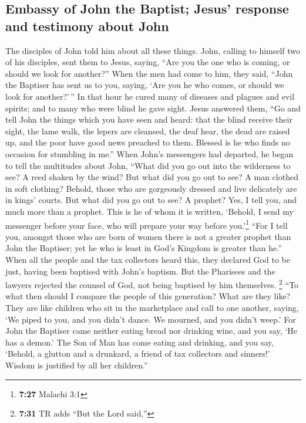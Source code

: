 \hypertarget{embassy-of-john-the-baptist-jesus-response-and-testimony-about-john}{%
\subsection{Embassy of John the Baptist; Jesus' response and testimony
about
John}\label{embassy-of-john-the-baptist-jesus-response-and-testimony-about-john}}

 The disciples of John told him about all these things.
 John, calling to himself two of his disciples, sent them
to Jesus, saying, ``Are you the one who is coming, or should we look for
another?''  When the men had come to him, they said,
``John the Baptiser has sent us to you, saying, `Are you he who comes,
or should we look for another?'\,''  In that hour he
cured many of diseases and plagues and evil spirits; and to many who
were blind he gave sight.  Jesus answered them, ``Go and
tell John the things which you have seen and heard: that the blind
receive their sight, the lame walk, the lepers are cleansed, the deaf
hear, the dead are raised up, and the poor have good news preached to
them.  Blessed is he who finds no occasion for stumbling
in me.''  When John's messengers had departed, he began
to tell the multitudes about John, ``What did you go out into the
wilderness to see? A reed shaken by the wind?  But what
did you go out to see? A man clothed in soft clothing? Behold, those who
are gorgeously dressed and live delicately are in kings' courts.
 But what did you go out to see? A prophet? Yes, I tell
you, and much more than a prophet.  This is he of whom it
is written, `Behold, I send my messenger before your face, who will
prepare your way before you.'\footnote{\textbf{7:27} Malachi 3:1}
 ``For I tell you, amongst those who are born of women
there is not a greater prophet than John the Baptiser; yet he who is
least in God's Kingdom is greater than he.''  When all
the people and the tax collectors heard this, they declared God to be
just, having been baptised with John's baptism.  But the
Pharisees and the lawyers rejected the counsel of God, not being
baptised by him themselves.  \footnote{\textbf{7:31} TR
  adds ``But the Lord said,''} ``To what then should I compare the
people of this generation? What are they like?  They are
like children who sit in the marketplace and call to one another,
saying, `We piped to you, and you didn't dance. We mourned, and you
didn't weep.'  For John the Baptiser came neither eating
bread nor drinking wine, and you say, `He has a demon.' 
The Son of Man has come eating and drinking, and you say, `Behold, a
glutton and a drunkard, a friend of tax collectors and sinners!'
 Wisdom is justified by all her children.''

